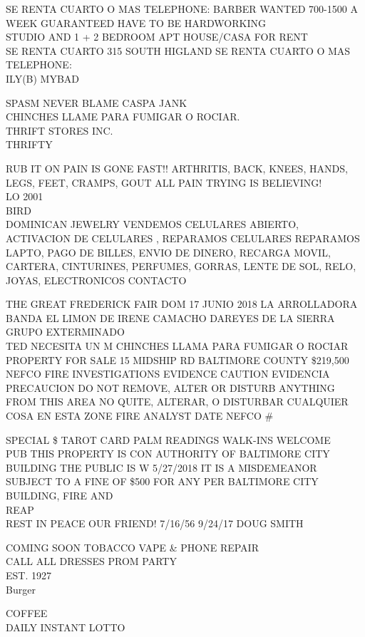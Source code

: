 \documentclass[10pt,letterpaper]{article}
\begin{document}
SE RENTA CUARTO O MAS TELEPHONE: BARBER WANTED 700{-}1500 A WEEK GUARANTEED HAVE TO BE HARDWORKING\\
STUDIO AND 1 + 2 BEDROOM APT HOUSE/CASA FOR RENT\\
SE RENTA CUARTO 315 SOUTH HIGLAND SE RENTA CUARTO O MAS TELEPHONE:\\
ILY(B) MYBAD

SPASM NEVER BLAME CASPA JANK\\
CHINCHES LLAME PARA FUMIGAR O ROCIAR.\\
THRIFT STORES INC.\\
THRIFTY

RUB IT ON PAIN IS GONE FAST!! ARTHRITIS, BACK, KNEES, HANDS, LEGS, FEET, CRAMPS, GOUT ALL PAIN TRYING IS BELIEVING!\\
LO 2001\\
BIRD\\
DOMINICAN JEWELRY VENDEMOS CELULARES ABIERTO, ACTIVACION DE CELULARES , REPARAMOS CELULARES REPARAMOS LAPTO, PAGO DE BILLES, ENVIO DE DINERO, RECARGA MOVIL, CARTERA, CINTURINES, PERFUMES, GORRAS, LENTE DE SOL, RELO, JOYAS, ELECTRONICOS CONTACTO

THE GREAT FREDERICK FAIR DOM 17 JUNIO 2018 LA ARROLLADORA BANDA EL LIMON DE IRENE CAMACHO DAREYES DE LA SIERRA GRUPO EXTERMINADO\\
TED NECESITA UN M CHINCHES LLAMA PARA FUMIGAR O ROCIAR\\
PROPERTY FOR SALE 15 MIDSHIP RD BALTIMORE COUNTY \$219,500\\
NEFCO FIRE INVESTIGATIONS EVIDENCE CAUTION EVIDENCIA PRECAUCION DO NOT REMOVE, ALTER OR DISTURB ANYTHING FROM THIS AREA NO QUITE, ALTERAR, O DISTURBAR CUALQUIER COSA EN ESTA ZONE FIRE ANALYST DATE NEFCO \#

SPECIAL \$ TAROT CARD PALM READINGS WALK{-}INS WELCOME\\
PUB THIS PROPERTY IS CON AUTHORITY OF BALTIMORE CITY BUILDING THE PUBLIC IS W 5/27/2018 IT IS A MISDEMEANOR SUBJECT TO A FINE OF \$500 FOR ANY PER BALTIMORE CITY BUILDING, FIRE AND\\
REAP\\
REST IN PEACE OUR FRIEND!  7/16/56 9/24/17 DOUG SMITH

COMING SOON TOBACCO VAPE \& PHONE REPAIR\\
CALL ALL DRESSES PROM PARTY\\
EST. 1927\\
Burger

COFFEE\\
DAILY INSTANT LOTTO
\end{document}

